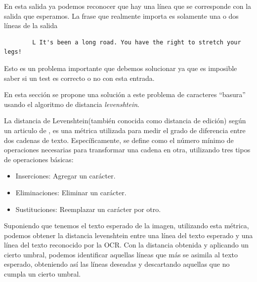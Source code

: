 En esta salida ya podemos reconocer que hay una línea que se corresponde con la salida que esperamos.
La frase que realmente importa es solamente una o dos líneas de la salida
\begin{verbatim}
		L It's been a long road. You have the right to stretch your legs!
\end{verbatim}
Esto es un problema importante que debemos solucionar ya que es imposible saber si un test es correcto o no con esta entrada.

En esta sección se propone una solución a este problema de caracteres ``basura'' usando el algoritmo de distancia \emph{levenshtein}.

La distancia de Levenshtein(también conocida como distancia de edición) según un articulo de \cite{LevDistance}, es una métrica utilizada para medir el grado de diferencia entre dos cadenas de texto. Específicamente, se define como el número mínimo de operaciones necesarias para transformar una cadena en otra, utilizando tres tipos de operaciones básicas:
\begin{itemize}
	\item Inserciones: Agregar un carácter.
	\item Eliminaciones: Eliminar un carácter.
	\item Sustituciones: Reemplazar un carácter por otro.
\end{itemize}

Suponiendo que tenemos el texto esperado de la imagen,  utilizando esta métrica, podemos obtener la distancia levenshtein entre una línea del texto esperado y una línea del texto reconocido por la OCR. Con la distancia obtenida y aplicando un cierto umbral, podemos identificar aquellas líneas que más se asimila al texto esperado, obteniendo así las líneas deseadas y descartando aquellas que no cumpla un cierto umbral.

